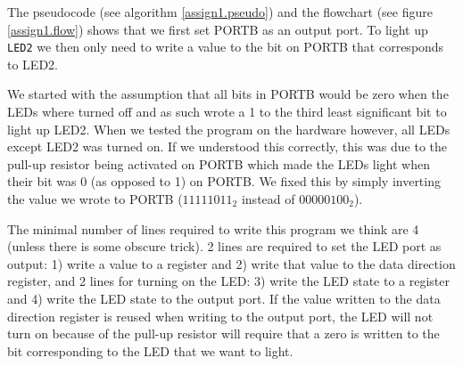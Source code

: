 The pseudocode (see algorithm \ref{assign1.pseudo}) and the flowchart (see
figure \ref{assign1.flow}) shows that we first set PORTB as an output port. To
light up \texttt{LED2} we then only need to write a value to the bit on PORTB that
corresponds to LED2. 

We started with the assumption that all bits in PORTB would be zero when the
LEDs where turned off and as such wrote a 1 to the third least significant bit 
to light up LED2. When we tested the program on the hardware however, all LEDs
except LED2 was turned on. If we understood this correctly, this was due to the
pull-up resistor being activated on PORTB which made the LEDs light when their
bit was 0 (as opposed to 1) on PORTB. We fixed this by simply inverting the 
value we wrote to PORTB (${1111 1011}_2$ instead of ${0000 0100}_2$).

The minimal number of lines required to write this program we think are 4 
(unless there is some obscure trick). 2 lines are required to set the LED port
as output: 1) write a value to a register and 2) write that value to the data
direction register, and 2 lines for turning on the LED: 3) write the LED state
to a register and 4) write the LED state to the output port. If the value
written to the data direction register is reused when writing to the output
port, the LED will not turn on because of the pull-up resistor will require
that a zero is written to the bit corresponding to the LED that we want to
light.
